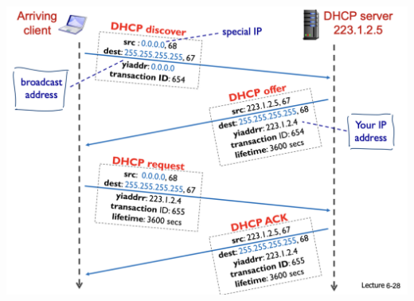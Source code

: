 \documentclass{article}
\begin{document}
\begin{multicols*}{3}
\includegraphics[scale=0.2]{dhcp}

\end{multicols*}
\end{document}
